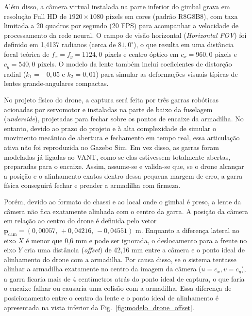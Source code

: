 Além disso, a câmera virtual instalada na parte inferior do gimbal grava em resolução Full HD de $1920 \times 1080$ pixels em cores (padrão R8G8B8), com taxa limitada a 20 quadros por segundo (20 FPS) para acompanhar a velocidade de processamento da rede neural. O campo de visão horizontal (\textit{Horizontal FOV}) foi definido em 1,4137 radianos (cerca de $81,0^\circ$), o que resulta em uma distância focal teórica de $f_x = f_y = 1124,0$ pixels e centro óptico em $c_x = 960,0$ pixels e $c_y = 540,0$ pixels. O modelo da lente também inclui coeficientes de distorção radial ($k_1 = -0,05$ e $k_2 = 0,01$) para simular as deformações visuais típicas de lentes grande-angulares compactas.

No projeto físico do drone, a captura será feita por três garras robóticas acionadas por servomotor e instaladas na parte de baixo da fuselagem (\textit{underside}), projetadas para fechar sobre os pontos de encaixe da armadilha. No entanto, devido ao prazo do projeto e à alta complexidade de simular o movimento mecânico de abertura e fechamento em tempo real, essa articulação ativa não foi reproduzida no Gazebo Sim. Em vez disso, as garras foram modeladas já ligadas ao VANT, como se elas estivessem totalmente abertas, preparadas para o encaixe. Assim, assume-se e valida-se que, se o drone alcançar a posição e o alinhamento exatos dentro dessa pequena margem de erro, a garra física conseguirá fechar e prender a armadilha com firmeza.

Porém, devido ao formato do chassi e ao local onde o gimbal é preso, a lente da câmera não fica exatamente alinhada com o centro da garra. A posição da câmera em relação ao centro do drone é definida pelo vetor $\mathbf{p}_{\text{cam}} = (0{,}00057,\, +0{,}04216,\, -0{,}04551)\text{ m}$. Enquanto a diferença lateral no eixo $X$ é menor que 0,6 mm e pode ser ignorada, o deslocamento para a frente no eixo $Y$ cria uma distância (\textit{offset}) de 42,16 mm entre a câmera e o ponto ideal de alinhamento do drone com a armadilha. Por causa disso, se o sistema tentasse alinhar a armadilha exatamente no centro da imagem da câmera ($u = c_x, v = c_y$), a garra ficaria mais de 4 centímetros atrás do ponto ideal de captura, o que faria o encaixe falhar ou causaria uma colisão com a armadilha. Essa diferença de posicionamento entre o centro da lente e o ponto ideal de alinhamento é apresentada na vista inferior da Fig.~\ref{fig:modelo_drone_offset}.


